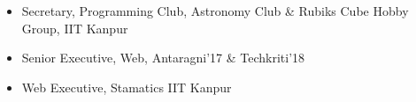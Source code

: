 
{\fontsize{11pt}{1em}\bodyfontlight\upshape\color{text}
  \begin{itemize}
  \item Secretary, Programming Club, Astronomy Club \& Rubiks Cube Hobby Group, IIT Kanpur
  \item Senior Executive, Web, Antaragni'17 \& Techkriti'18
  \item Web Executive, Stamatics IIT Kanpur
  \end{itemize}
}